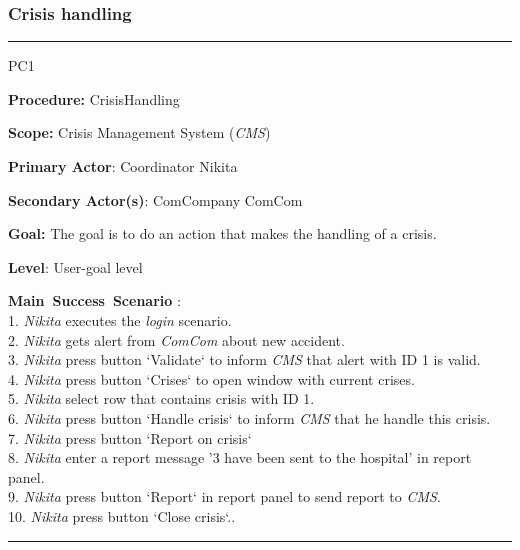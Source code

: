 \subsubsection{Crisis handling}
\vspace{0.5cm}
\hrule
\begin{lyxlist}{PC1}
\small{
\item [\textbf{Procedure:}] CrisisHandling
\item [\textbf{Scope:}]  Crisis Management System (\emph{CMS})
\item [\textbf{Primary Actor}:] Coordinator Nikita
\item [\textbf{Secondary Actor(s)}:] ComCompany ComCom
\item [\textbf{Goal:}] The goal is to do an action that makes the handling of a
crisis.
\item [\textbf{Level}:] User-goal level
\item [\textbf{Main~Success~Scenario}]:\\
1. \emph{Nikita} executes the \emph{login} scenario. \\
2. \emph{Nikita} gets alert from \emph{ComCom} about new accident. \\
3. \emph{Nikita} press button `Validate` to inform \emph{CMS} that alert with
ID 1 is valid.\\
4. \emph{Nikita} press button `Crises` to open window with current crises.\\
5. \emph{Nikita} select row that contains crisis with ID 1.\\
6. \emph{Nikita} press button `Handle crisis` to inform \emph{CMS} that he
handle this crisis.\\
7. \emph{Nikita} press button `Report on crisis`\\
8. \emph{Nikita} enter a report message '3 have been sent to the hospital' in
report panel.\\
9. \emph{Nikita} press button `Report` in report panel to send report to
\emph{CMS}.\\
10. \emph{Nikita} press button `Close crisis`..\\
}
\end{lyxlist}
\hrule
\vspace{0.5cm}













